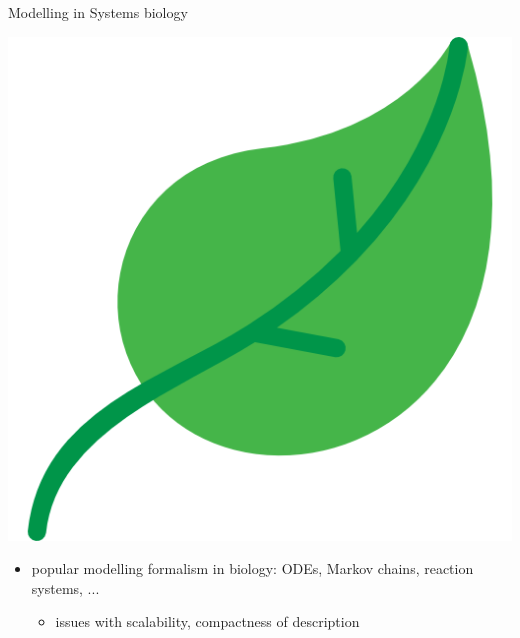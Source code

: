 \documentclass[10pt]{beamer}
\begin{document}
\begin{frame}[fragile]{Modelling in Systems biology}
\begin{minipage}{0.1\textwidth}
\begin{center}
\end{center}
\end{minipage}
\begin{minipage}{0.4\textwidth}
\begin{center}
\includegraphics[scale=0.15]{pics/model_leaf.png}
\end{center}
\end{minipage}
\hfill

\begin{itemize}
	\item popular modelling formalism in biology: ODEs, Markov chains, reaction systems, ...
	\begin{itemize}
		\item issues with scalability, compactness of description
	\end{itemize}
\end{itemize}

\end{frame}

\end{document}
